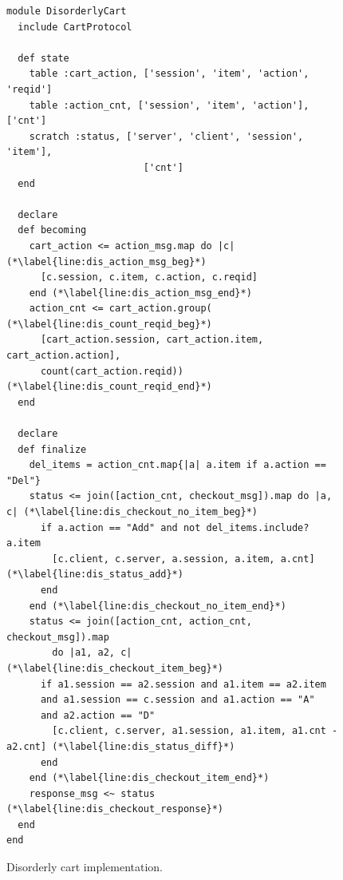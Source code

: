 \begin{figure}[t]
\begin{scriptsize}
\begin{lstlisting}
module DisorderlyCart
  include CartProtocol

  def state
    table :cart_action, ['session', 'item', 'action', 'reqid']
    table :action_cnt, ['session', 'item', 'action'], ['cnt']
    scratch :status, ['server', 'client', 'session', 'item'],
                        ['cnt']
  end

  declare
  def becoming
    cart_action <= action_msg.map do |c|  (*\label{line:dis_action_msg_beg}*)
      [c.session, c.item, c.action, c.reqid] 
    end (*\label{line:dis_action_msg_end}*)
    action_cnt <= cart_action.group(  (*\label{line:dis_count_reqid_beg}*)
      [cart_action.session, cart_action.item, cart_action.action],
      count(cart_action.reqid))  (*\label{line:dis_count_reqid_end}*)
  end

  declare
  def finalize
    del_items = action_cnt.map{|a| a.item if a.action == "Del"}
    status <= join([action_cnt, checkout_msg]).map do |a, c| (*\label{line:dis_checkout_no_item_beg}*)
      if a.action == "Add" and not del_items.include? a.item
        [c.client, c.server, a.session, a.item, a.cnt] (*\label{line:dis_status_add}*)
      end
    end (*\label{line:dis_checkout_no_item_end}*)
    status <= join([action_cnt, action_cnt, checkout_msg]).map 
        do |a1, a2, c| (*\label{line:dis_checkout_item_beg}*)
      if a1.session == a2.session and a1.item == a2.item
      and a1.session == c.session and a1.action == "A" 
      and a2.action == "D"
        [c.client, c.server, a1.session, a1.item, a1.cnt - a2.cnt] (*\label{line:dis_status_diff}*)
      end
    end (*\label{line:dis_checkout_item_end}*)
    response_msg <~ status (*\label{line:dis_checkout_response}*)
  end
end
\end{lstlisting}
\vspace{-10pt}
\caption{Disorderly cart implementation.}
\label{fig:dis-cart}
\end{scriptsize}
\vspace{-2pt}
\end{figure}

